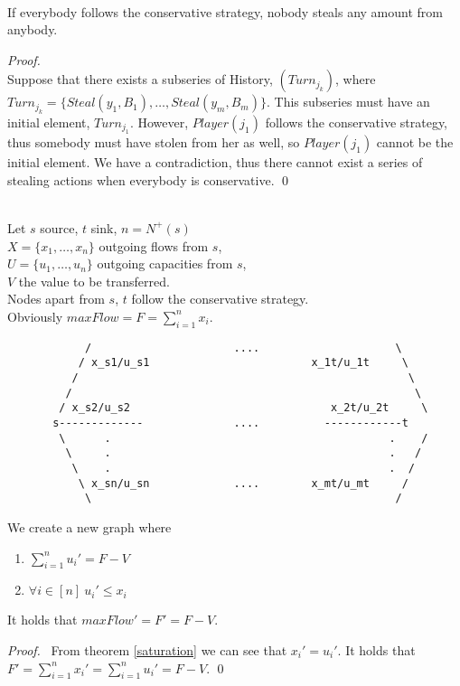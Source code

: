 \documentclass[11pt]{llncs}
\begin{document}
    \begin{theorem} \ \\
       \label{conservativeworld}
       If everybody follows the conservative strategy, nobody steals any amount from anybody.
    \end{theorem}
    \begin{proof} \ \\
       Suppose that there exists a subseries of History, $(Turn_{j_k})$, where $Turn_{j_k} = \{Steal(y_1,B_1),\dots,
       Steal(y_m,B_m)\}$. This subseries must have an initial element, $Turn_{j_1}$. However, $Player(j_1)$ follows the conservative
       strategy, thus somebody must have stolen from her as well, so $Player(j_1)$ cannot be the initial element. We have a
       contradiction, thus there cannot exist a series of stealing actions when everybody is conservative. \qed
    \end{proof}

    \begin{theorem} \ \\
       \label{trusttransfer}
       Let $s$ source, $t$ sink, $n = N^{+}(s)$ \\
       $X = \{x_1, \dots, x_n\}$ outgoing flows from $s$, \\
       $U = \{u_1, \dots, u_n\}$ outgoing capacities from $s$, \\
       $V$ the value to be transferred. \\
       Nodes apart from $s$, $t$ follow the conservative strategy. \\
       Obviously $maxFlow = F = \sum\limits_{i=1}^{n}{x_i}$.
       {\em \begin{lstlisting}
            /                      ....                     \
           / x_s1/u_s1                         x_1t/u_1t     \
          /                                                   \
         /                                                     \
        / x_s2/u_s2                               x_2t/u_2t     \
       s-------------              ....          ------------t
        \      .                                           .    /
         \     .                                           .   /
          \    .                                           .  /
           \ x_sn/u_sn             ....        x_mt/u_mt     /
            \                                               /
       \end{lstlisting}}
       We create a new graph where
       \begin{enumerate}
         \item  $\sum\limits_{i=1}^{n}{u_i'} = F - V$
         \item $\forall i \in [n] \: u_i' \leq x_i$
       \end{enumerate}
 
       It holds that $maxFlow' = F' = F - V$.
    \end{theorem}
    \begin{proof} \
        From theorem \ref{saturation} we can see that $x_i' = u_i'$. It holds that $F' = \sum\limits_{i=1}^nx_i' =
        \sum\limits_{i=1}^nu_i' = F - V$. \qed
    \end{proof}
\end{document}
